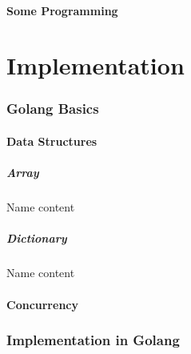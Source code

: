 \documentclass{beamer}[10]
\begin{document}
    \subsection{Some Programming}

\part{Implementation}
\section{Golang Basics}
    \subsection{Data Structures}
        \subsubsection{Array}
                \begin{frame}{Name}{\subsubsecname}	content \end{frame}
        \subsubsection{Dictionary}
                \begin{frame}{Name}{\subsubsecname}	content \end{frame}
    \subsection{Concurrency}
\section{Implementation in Golang}
\end{document}
